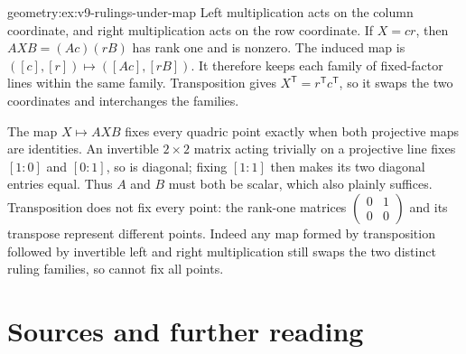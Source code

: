 \begin{solution}{geometry:ex:v9-rulings-under-map}
\idea Left multiplication acts on the column coordinate, and right
multiplication acts on the row coordinate.
\writeup If $X=cr$, then $AXB=(Ac)(rB)$ has rank one and is nonzero.
The induced map is $([c],[r])\mapsto([Ac],[rB])$.
It therefore keeps each family of fixed-factor lines within the same
family. Transposition gives $X^{\mathsf T}=r^{\mathsf T}c^{\mathsf T}$,
so it swaps the two coordinates and interchanges the families.

The map $X\mapsto AXB$ fixes every quadric point exactly when both
projective maps are identities. An invertible $2\times2$ matrix acting
trivially on a projective line fixes $[1:0]$ and $[0:1]$, so is diagonal;
fixing $[1:1]$ then makes its two diagonal entries equal.
Thus $A$ and $B$ must both be scalar, which also plainly suffices.
Transposition does not fix every point: the rank-one matrices
$\left(\begin{smallmatrix}0&1\\0&0\end{smallmatrix}\right)$ and its
transpose represent different points. Indeed any map formed by
transposition followed by invertible left and right multiplication still
swaps the two distinct ruling families, so cannot fix all points.
\end{solution}

\section*{Sources and further reading}

